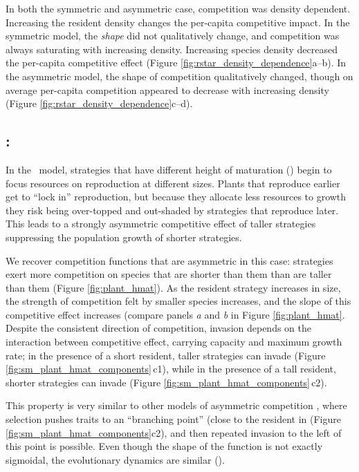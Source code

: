 \documentclass[a4paper,11pt]{article}
\begin{document}
In both the symmetric and asymmetric case, competition was density
dependent.  Increasing the resident density changes the per-capita
competitive impact.
%
In the symmetric model, the \emph{shape} did not qualitatively change,
and competition was always saturating with increasing density.
Increasing species density decreased the per-capita competitive effect
(Figure \ref{fig:rstar_density_dependence}a--b).
%
In the asymmetric model, the shape of competition qualitatively
changed, though on average per-capita competition appeared to decrease
with increasing density (Figure
\ref{fig:rstar_density_dependence}c--d).

\subsection{\plant: \hmat}

In the \plant\ model, strategies that have different height of
maturation (\hmat) begin to focus resources on reproduction at
different sizes.  Plants that reproduce earlier get to ``lock in''
reproduction, but because they allocate less resources to growth they
risk being over-topped and out-shaded by strategies that reproduce
later.  This leads to a strongly asymmetric competitive effect of
taller strategies suppressing the population growth of shorter
strategies.

We recover competition functions that are asymmetric in this case:
strategies exert more competition on species that are shorter than
them than are taller than them (Figure \ref{fig:plant_hmat}).  As the
resident strategy increases in size, the strength of competition felt
by smaller species increases, and the slope of this competitive effect
increases (compare panels \textit{a} and \textit{b} in Figure
\ref{fig:plant_hmat}.
%
Despite the consistent direction of competition, invasion depends on
the interaction between competitive effect, carrying capacity and
maximum growth rate; in the presence of a short resident, taller
strategies can invade (Figure \ref{fig:sm_plant_hmat_components}\,c1),
while in the presence of a tall resident, shorter strategies can
invade (Figure \ref{fig:sm_plant_hmat_components}\,c2).

This property is very similar to other models of asymmetric
competition \citep[e.g.,][]{Kisdi-1999}, where selection pushes traits
to an ``branching point'' (close to the resident in (Figure
\ref{fig:sm_plant_hmat_components}c2), and then repeated invasion to
the left of this point is possible.
Even though the shape of the function is not exactly sigmoidal, the
evolutionary dynamics are similar (\TODO).
\end{document}
